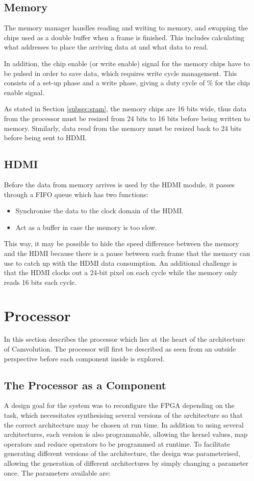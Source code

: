 \subsection{Memory}
The memory manager handles reading and writing to memory, and swapping the chips used as a double buffer when a frame is finished.
This includes calculating what addresses to place the arriving data at and what data to read.

In addition, the chip enable (or write enable) signal for the memory chips have to be pulsed in order to save data, which requires write cycle management.
This consists of a set-up phase and a write phase, giving a duty cycle of \unit[50]{\%} for the chip enable signal.

As stated in Section \ref{subsec:sram}, the memory chips are 16 bits wide, thus data from the processor must be resized from 24 bits to 16 bits before being written to memory.
Similarly, data read from the memory must be resized back to 24 bits before being sent to HDMI.

\subsection{HDMI}
Before the data from memory arrives is used by the HDMI module, it passes through a FIFO queue which has two functions:
\begin{itemize}
    \item Synchronise the data to the clock domain of the HDMI.
    \item Act as a buffer in case the memory is too slow.
\end{itemize}

This way, it may be possible to hide the speed difference between the memory and the HDMI because there is a pause between each frame that the memory can use to catch up with the HDMI data consumption.
An additional challenge is that the HDMI clocks out a 24-bit pixel on each cycle while the memory only reads 16 bits each cycle.

\section{Processor}
\label{sec:processor}
In this section describes the processor which lies at the heart of the architecture of Camvolution.
The processor will first be described as seen from an outside perspective before each component inside is explored.

\subsection{The Processor as a Component}
A design goal for the system was to reconfigure the FPGA depending on the task, which necessitates synthesising several versions of the architecture so that the correct architecture may be chosen at run time.
In addition to using several architectures, each version is also programmable, allowing the kernel values, map operators and reduce operators to be programmed at runtime.
To facilitate generating different versions of the architecture, the design was parameterised, allowing the generation of different architectures by simply changing a parameter once.
The parameters available are:

